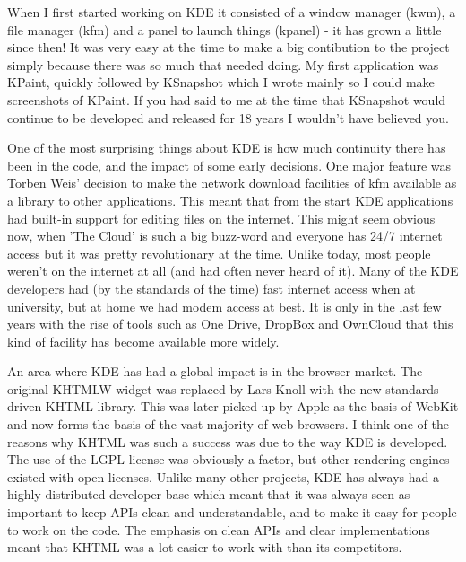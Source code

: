 

When I first started working on KDE it consisted of a window manager (kwm), a file manager (kfm) and a panel to launch things (kpanel) - it has grown a little since then! It was very easy at the time to make a big contibution to the project simply because there was so much that needed doing. My first application was KPaint, quickly followed by KSnapshot which I wrote mainly so I could make screenshots of KPaint. If you had said to me at the time that KSnapshot would continue to be developed and released for 18 years I wouldn't have believed you.

One of the most surprising things about KDE is how much continuity there has been in the code, and the impact of some early decisions. One major feature was Torben Weis' decision to make the network download facilities of kfm available as a library to other applications. This meant that from the start KDE applications had built-in support for editing files on the internet. This might seem obvious now, when 'The Cloud' is such a big buzz-word and everyone has 24/7 internet access but it was pretty revolutionary at the time. Unlike today, most people weren't on the internet at all (and had often never heard of it). Many of the KDE developers had (by the standards of the time) fast internet access when at university, but at home we had modem access at best. It is only in the last few years with the rise of tools such as One Drive, DropBox and OwnCloud that this kind of facility has become available more widely.

An area where KDE has had a global impact is in the browser market. The original KHTMLW widget was replaced by Lars Knoll with the new standards driven KHTML library. This was later picked up by Apple as the basis of WebKit and now forms the basis of the vast majority of web browsers. I think one of the reasons why KHTML was such a success was due to the way KDE is developed. The use of the LGPL license was obviously a factor, but other rendering engines existed with open licenses. Unlike many other projects, KDE has always had a highly distributed developer base which meant that it was always seen as important to keep APIs clean and understandable, and to make it easy for people to work on the code. The emphasis on clean APIs and clear implementations meant that KHTML was a lot easier to work with than its competitors.

